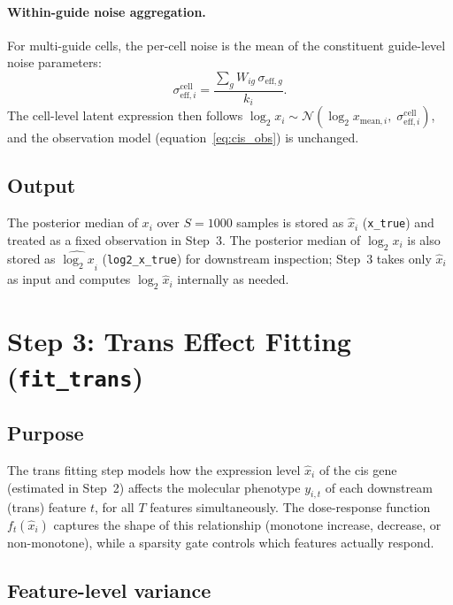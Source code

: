\documentclass[12pt]{article}
\begin{document}
\paragraph{Within-guide noise aggregation.}

For multi-guide cells, the per-cell noise is the mean of the constituent guide-level
noise parameters:
\begin{equation}
  \sigma_{\mathrm{eff},i}^{\mathrm{cell}} = \frac{\sum_g W_{ig}\,\sigma_{\mathrm{eff},g}}{k_i}.
\end{equation}
The cell-level latent expression then follows
$\log_2 x_i \sim \mathcal{N}\!\left(\log_2 x_{\mathrm{mean},i},\;
\sigma_{\mathrm{eff},i}^{\mathrm{cell}}\right)$,
and the observation model (equation~\ref{eq:cis_obs}) is unchanged.

\subsection{Output}

The posterior median of $x_i$ over $S = 1000$ samples is stored as $\hat x_i$
(\texttt{x\_true}) and treated as a fixed observation in Step~3.
The posterior median of $\log_2 x_i$ is also stored as $\widehat{\log_2 x}_i$
(\texttt{log2\_x\_true}) for downstream inspection; Step~3 takes only $\hat x_i$ as input
and computes $\log_2 \hat x_i$ internally as needed.

\section{Step 3: Trans Effect Fitting (\texttt{fit\_trans})}

\subsection{Purpose}

The trans fitting step models how the expression level $\hat x_i$ of the cis gene
(estimated in Step~2) affects the molecular phenotype $y_{i,t}$ of each downstream
(trans) feature $t$, for all $T$ features simultaneously.
%
The dose-response function $f_t(\hat x_i)$ captures the shape of this relationship
(monotone increase, decrease, or non-monotone), while a sparsity gate controls which
features actually respond.

\subsection{Feature-level variance}
\label{sec:trans_variance}
\end{document}

